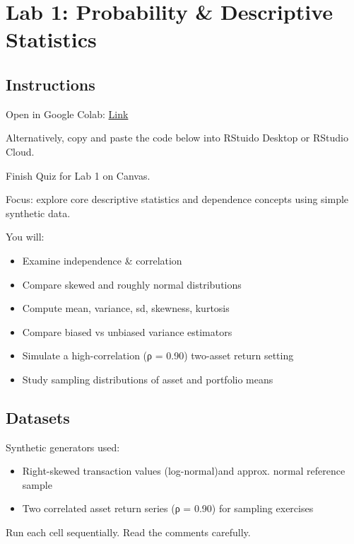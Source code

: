 \documentclass[
  12pt,
  letterpaper,
]{scrbook}
\providecommand{\tightlist}{%
  \setlength{\itemsep}{0pt}\setlength{\parskip}{0pt}}
\renewcommand{\tightlist}{\setlength{\itemsep}{0.5\baselineskip}\setlength{\parskip}{0.2\baselineskip}}
\theoremstyle{definition}
\theoremstyle{plain}
\theoremstyle{remark}
\begin{document}
\chapter{Lab 1: Probability \& Descriptive
Statistics}\label{lab-1-probability-descriptive-statistics}

\section{Instructions}\label{instructions}

Open in Google Colab:
\href{https://colab.research.google.com/drive/1JLABtp6OJUJHmODRHpQ9FQXovp73na_9?usp=share_link}{Link}

Alternatively, copy and paste the code below into RStuido Desktop or
RStudio Cloud.

Finish Quiz for Lab 1 on Canvas.

Focus: explore core descriptive statistics and dependence concepts using
simple synthetic data.

You will:

\begin{itemize}
\tightlist
\item
  Examine independence \& correlation
\item
  Compare skewed and roughly normal distributions
\item
  Compute mean, variance, sd, skewness, kurtosis
\item
  Compare biased vs unbiased variance estimators
\item
  Simulate a high-correlation (ρ = 0.90) two-asset return setting
\item
  Study sampling distributions of asset and portfolio means
\end{itemize}

\section{Datasets}\label{datasets}

Synthetic generators used:

\begin{itemize}
\tightlist
\item
  Right-skewed transaction values (log-normal)and approx. normal
  reference sample
\item
  Two correlated asset return series (ρ = 0.90) for sampling exercises
\end{itemize}

Run each cell sequentially. Read the comments carefully.
\end{document}
